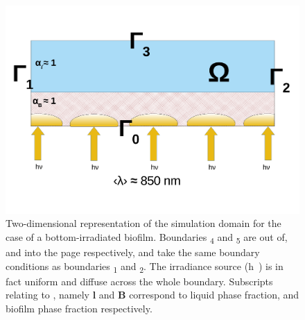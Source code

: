 



\begin{figure}[htpb]
    \centering
    \includegraphics[scale=0.5]{Images/Chap4/prob_diagram_below.pdf}
    \caption{Two-dimensional representation of the simulation domain for the case of a bottom-irradiated biofilm. Boundaries \si{\Gamma_4} and \si{\Gamma_5} are out of, and into the page respectively, and take the same boundary conditions as boundaries \si{\Gamma_1} and \si{\Gamma_2}. The irradiance source (\si{h \nu}) is in fact uniform and diffuse across the whole boundary. Subscripts relating to \si{\alpha}, namely \textbf{l} and \textbf{B} correspond to liquid phase fraction, and biofilm phase fraction respectively.} 
    \label{fig:2d_above}
\end{figure}


